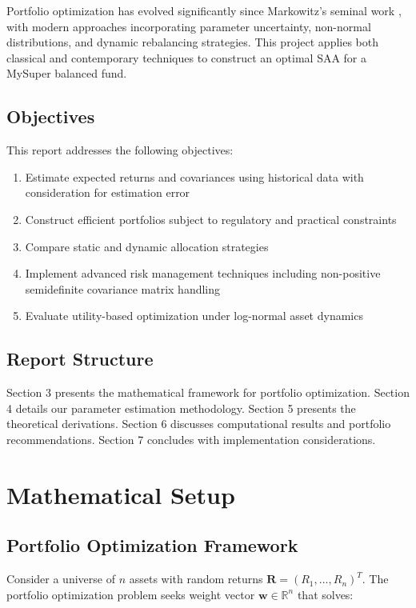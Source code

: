 \documentclass[12pt,a4paper]{article}
\newcommand{\R}{\mathbb{R}}
\begin{document}
Portfolio optimization has evolved significantly since Markowitz's seminal work \cite{markowitz1952}, with modern approaches incorporating parameter uncertainty, non-normal distributions, and dynamic rebalancing strategies. This project applies both classical and contemporary techniques to construct an optimal SAA for a MySuper balanced fund.

\subsection{Objectives}
This report addresses the following objectives:
\begin{enumerate}
    \item Estimate expected returns and covariances using historical data with consideration for estimation error
    \item Construct efficient portfolios subject to regulatory and practical constraints
    \item Compare static and dynamic allocation strategies
    \item Implement advanced risk management techniques including non-positive semidefinite covariance matrix handling
    \item Evaluate utility-based optimization under log-normal asset dynamics
\end{enumerate}

\subsection{Report Structure}
Section 3 presents the mathematical framework for portfolio optimization. Section 4 details our parameter estimation methodology. Section 5 presents the theoretical derivations. Section 6 discusses computational results and portfolio recommendations. Section 7 concludes with implementation considerations.

\section{Mathematical Setup}

\subsection{Portfolio Optimization Framework}

Consider a universe of $n$ assets with random returns $\mathbf{R} = (R_1, ..., R_n)^T$. The portfolio optimization problem seeks weight vector $\mathbf{w} \in \R^n$ that solves:
\end{document}
